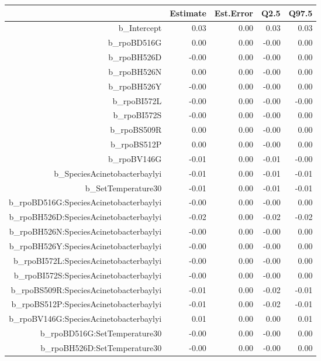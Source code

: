 \begin{table}[ht]
\centering
\begin{tabular}{rrrrr}
  \hline
 & Estimate & Est.Error & Q2.5 & Q97.5 \\ 
  \hline
b\_Intercept & 0.03 & 0.00 & 0.03 & 0.03 \\ 
  b\_rpoBD516G & 0.00 & 0.00 & -0.00 & 0.00 \\ 
  b\_rpoBH526D & -0.00 & 0.00 & -0.00 & 0.00 \\ 
  b\_rpoBH526N & 0.00 & 0.00 & -0.00 & 0.00 \\ 
  b\_rpoBH526Y & -0.00 & 0.00 & -0.00 & 0.00 \\ 
  b\_rpoBI572L & -0.00 & 0.00 & -0.00 & -0.00 \\ 
  b\_rpoBI572S & -0.00 & 0.00 & -0.00 & 0.00 \\ 
  b\_rpoBS509R & 0.00 & 0.00 & -0.00 & 0.00 \\ 
  b\_rpoBS512P & 0.00 & 0.00 & -0.00 & 0.00 \\ 
  b\_rpoBV146G & -0.01 & 0.00 & -0.01 & -0.00 \\ 
  b\_SpeciesAcinetobacterbaylyi & -0.01 & 0.00 & -0.01 & -0.01 \\ 
  b\_SetTemperature30 & -0.01 & 0.00 & -0.01 & -0.01 \\ 
  b\_rpoBD516G:SpeciesAcinetobacterbaylyi & -0.00 & 0.00 & -0.00 & 0.00 \\ 
  b\_rpoBH526D:SpeciesAcinetobacterbaylyi & -0.02 & 0.00 & -0.02 & -0.02 \\ 
  b\_rpoBH526N:SpeciesAcinetobacterbaylyi & -0.00 & 0.00 & -0.00 & 0.00 \\ 
  b\_rpoBH526Y:SpeciesAcinetobacterbaylyi & -0.00 & 0.00 & -0.00 & 0.00 \\ 
  b\_rpoBI572L:SpeciesAcinetobacterbaylyi & -0.00 & 0.00 & -0.00 & 0.00 \\ 
  b\_rpoBI572S:SpeciesAcinetobacterbaylyi & -0.00 & 0.00 & -0.00 & 0.00 \\ 
  b\_rpoBS509R:SpeciesAcinetobacterbaylyi & -0.01 & 0.00 & -0.02 & -0.01 \\ 
  b\_rpoBS512P:SpeciesAcinetobacterbaylyi & -0.01 & 0.00 & -0.02 & -0.01 \\ 
  b\_rpoBV146G:SpeciesAcinetobacterbaylyi & 0.01 & 0.00 & 0.00 & 0.01 \\ 
  b\_rpoBD516G:SetTemperature30 & -0.00 & 0.00 & -0.00 & 0.00 \\ 
  b\_rpoBH526D:SetTemperature30 & -0.00 & 0.00 & -0.00 & 0.00 \\ 

\end{tabular}
\end{table}

